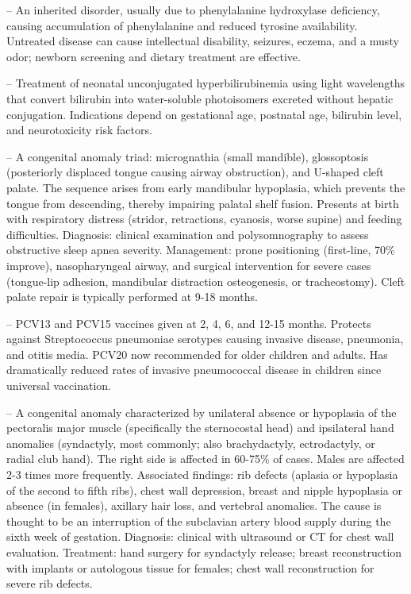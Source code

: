 -- An inherited disorder, usually due to phenylalanine hydroxylase deficiency, causing accumulation of phenylalanine and reduced tyrosine availability. Untreated disease can cause intellectual disability, seizures, eczema, and a musty odor; newborn screening and dietary treatment are effective.

-- Treatment of neonatal unconjugated hyperbilirubinemia using light wavelengths that convert bilirubin into water-soluble photoisomers excreted without hepatic conjugation. Indications depend on gestational age, postnatal age, bilirubin level, and neurotoxicity risk factors.

-- A congenital anomaly triad: micrognathia (small mandible), glossoptosis (posteriorly displaced tongue causing airway obstruction), and U-shaped cleft palate. The sequence arises from early mandibular hypoplasia, which prevents the tongue from descending, thereby impairing palatal shelf fusion. Presents at birth with respiratory distress (stridor, retractions, cyanosis, worse supine) and feeding difficulties. Diagnosis: clinical examination and polysomnography to assess obstructive sleep apnea severity. Management: prone positioning (first-line, 70\% improve), nasopharyngeal airway, and surgical intervention for severe cases (tongue-lip adhesion, mandibular distraction osteogenesis, or tracheostomy). Cleft palate repair is typically performed at 9-18 months.

-- PCV13 and PCV15 vaccines given at 2, 4, 6, and 12-15 months. Protects against Streptococcus pneumoniae serotypes causing invasive disease, pneumonia, and otitis media. PCV20 now recommended for older children and adults. Has dramatically reduced rates of invasive pneumococcal disease in children since universal vaccination.

-- A congenital anomaly characterized by unilateral absence or hypoplasia of the pectoralis major muscle (specifically the sternocostal head) and ipsilateral hand anomalies (syndactyly, most commonly; also brachydactyly, ectrodactyly, or radial club hand). The right side is affected in 60-75\% of cases. Males are affected 2-3 times more frequently. Associated findings: rib defects (aplasia or hypoplasia of the second to fifth ribs), chest wall depression, breast and nipple hypoplasia or absence (in females), axillary hair loss, and vertebral anomalies. The cause is thought to be an interruption of the subclavian artery blood supply during the sixth week of gestation. Diagnosis: clinical with ultrasound or CT for chest wall evaluation. Treatment: hand surgery for syndactyly release; breast reconstruction with implants or autologous tissue for females; chest wall reconstruction for severe rib defects.

